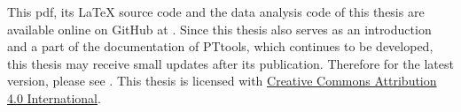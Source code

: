 This pdf, its LaTeX source code and the data analysis code of this thesis are available online on GitHub at \cite{thesis_source}.
Since this thesis also serves as an introduction and a part of the documentation of PTtools,
which continues to be developed,
this thesis may receive small updates after its publication.
Therefore for the latest version, please see \cite{thesis_source}.
This thesis is licensed with
\href{https://creativecommons.org/licenses/by/4.0/}{Creative Commons Attribution 4.0 International}.
